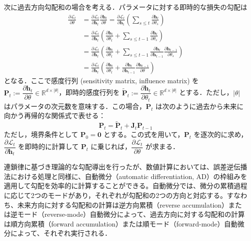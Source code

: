\documentclass[titlepage]{ltjsbook}
\begin{document}
次に過去方向勾配和の場合を考える．パラメータに対する即時的な損失の勾配は
\begin{align}
\frac{\partial \mathcal{L}_t}{\partial \theta}&=\frac{\partial \mathcal{L}_t}{\partial \mathbf{h}_t}\frac{\partial \mathbf{h}_t}{\partial \theta}=\frac{\partial \mathcal{L}_t}{\partial \mathbf{h}_t}\left(\sum_{s\leq t} \frac{\partial \mathbf{h}_t}{\partial \theta_s}\right)\\
&=\frac{\partial \mathcal{L}_t}{\partial \mathbf{h}_t}\left(\frac{\partial \mathbf{h}_t}{\partial \theta_t} + \sum_{s\leq t-1} \frac{\partial \mathbf{h}_t}{\partial \theta_s}\right)\\
&=\frac{\partial \mathcal{L}_t}{\partial \mathbf{h}_t}\left(\frac{\partial \mathbf{h}_t}{\partial \theta_t} + \sum_{s\leq t-1} \frac{\partial \mathbf{h}_t}{\partial \mathbf{h}_{t-1}}\frac{\partial \mathbf{h}_{t-1}}{\partial \theta_s}\right)\\
&=\frac{\partial \mathcal{L}_t}{\partial \mathbf{h}_t}\left(\frac{\partial \mathbf{h}_t}{\partial \theta_t} + \frac{\partial \mathbf{h}_t}{\partial \mathbf{h}_{t-1}}\frac{\partial \mathbf{h}_{t-1}}{\partial \theta}\right)
\end{align}
となる．ここで感度行列 (sensitivity matrix, influence matrix) を $\mathbf{P}_t:=\dfrac{\partial \mathbf{h}_t}{\partial \theta}\in \mathbb{R}^{d \times |\theta|}$，即時的感度行列を $\tilde{\mathbf{P}}_t:=\dfrac{\partial \mathbf{h}_t}{\partial \theta_t}\in \mathbb{R}^{d \times |\theta|}$ とする．ただし，$|\theta|$ はパラメータの次元数を意味する．この場合，$\mathbf{P}_t$ は次のように過去から未来に向かう再帰的な関係式で表せる：
\begin{equation}
\mathbf{P}_t=\tilde{\mathbf{P}}_t + \mathbf{J}_{t}\mathbf{P}_{t-1}
\end{equation}
ただし，境界条件として $\mathbf{P}_{0}=\mathbf{0}$ とする。この式を用いて，$\mathbf{P}_t$ を逐次的に求め，$\dfrac{\partial \mathcal{L}_t}{\partial \mathbf{h}_t}$ を即時的に計算して $\mathbf{P}_t$ に乗じれば，$\dfrac{\partial \mathcal{L}_t}{\partial \theta}$ が求まる．

連鎖律に基づき理論的な勾配導出を行ったが、数値計算においては、誤差逆伝播法における処理と同様に、自動微分（automatic differentiation, AD）の枠組みを適用して勾配を効率的に計算することができる。自動微分では、微分の累積過程に応じて2つのモードがあり，それぞれが勾配和の2つの方向と対応する。すなわち、未来方向に対する勾配和の計算は逆方向累積（reverse accumulation）または逆モード（reverse-mode）自動微分によって、過去方向に対する勾配和の計算は順方向累積（forward accumulation）または順モード（forward-mode）自動微分によって、それぞれ実行される．
\end{document}

